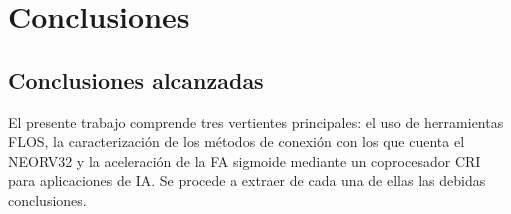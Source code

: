 
\chapter{Conclusiones} %

\label{Conclusiones} %

\section{Conclusiones alcanzadas}

El presente trabajo comprende tres vertientes principales: el uso de herramientas FLOS, la caracterización de los métodos de conexión con los que cuenta el NEORV32 y la aceleración de la FA sigmoide mediante un coprocesador CRI para aplicaciones de IA.
Se procede a extraer de cada una de ellas las debidas conclusiones.

